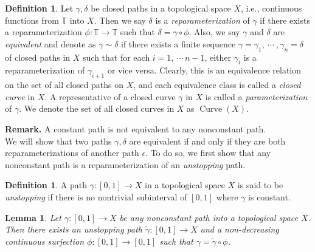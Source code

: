 \documentclass[reqno,centertags,12pt]{amsart}
\newtheorem{lemma}[theorem]{Lemma}
\theoremstyle{definition}
\newtheorem{definition}[theorem]{Definition}
\numberwithin{equation}{section}
\newcommand{\bbT}{{\mathbb{T}}}
\begin{document}
\begin{definition}
    Let $\gamma,\delta$ be closed paths in a topological space $X$, i.e., continuous functions
	from $\bbT$ into $X$. Then we say $\delta$ is a \emph{reparameterization} of $\gamma$
	if there exists a reparameterization $\phi\colon\bbT\to\bbT$ such that
	$\delta=\gamma\circ\phi$. Also, we say $\gamma$ and $\delta$ are \emph{equivalent}
    and denote as $\gamma\sim \delta$ if there exists a finite sequence
    $\gamma=\gamma_{1},\ \cdots\ ,\gamma_{n}=\delta$ of closed paths in $X$ such that
    for each $i=1,\ \cdots \,n-1$, either $\gamma_{i}$ is a reparameterization of
    $\gamma_{i+1}$ or vice versa. Clearly, this is an equivalence
	relation on the set of all closed paths on $X$, and each equivalence class
	is called a \emph{closed curve} in $X$. A representative of a closed curve
    $\gamma$ in $X$ is called a \emph{parameterization} of $\gamma$.
    We denote the set of all closed curves in $X$ as $\operatorname{Curve}(X)$.
\end{definition}

\textbf{Remark.} A constant path is not equivalent to any nonconstant path.\\

We will show that two paths $\gamma,\delta$ are equivalent if and only if
they are both reparameterizations of another path $\epsilon$.
To do so, we first show that any nonconstant path is a reparameterization of
an \emph{unstopping} path.

\begin{definition}
	A path $\gamma\colon[0,1]\to X$ in a topological space $X$ is said to be
	\emph{unstopping} if there is no nontrivial subinterval of $[0,1]$
    where $\gamma$ is constant.
\end{definition}

\begin{lemma}\label{LA.5}
	Let $\gamma\colon[0,1]\to X$ be any nonconstant path into a topological space $X$.
	Then there exists an unstopping path $\tilde{\gamma}\colon[0,1]\to X$
	and a non-decreasing continuous surjection $\phi\colon[0,1]\to[0,1]$ such that
	$\gamma = \tilde{\gamma}\circ\phi$.
\end{lemma}
\end{document}
